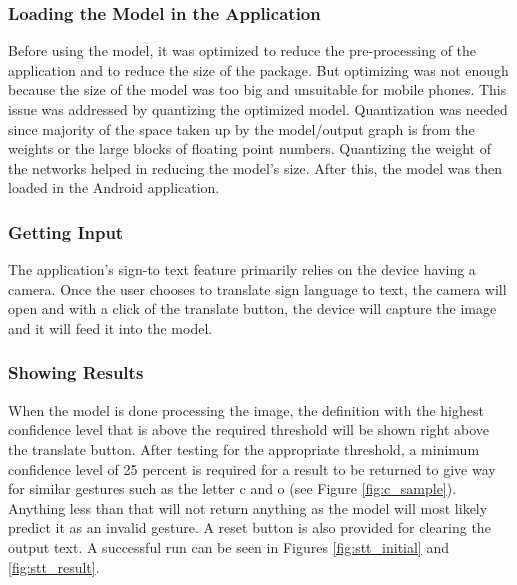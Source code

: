 \documentclass[journal]{./IEEE/IEEEtran}
\begin{document}
\subsubsection{Loading the Model in the Application}
Before using the model, it was optimized to reduce the pre-processing of the application and to reduce the size of the package. But optimizing was not enough because the size of the model was too big and unsuitable for mobile phones. This issue was addressed by quantizing the optimized model.
\newline
\indent Quantization was needed since majority of the space taken up by the model/output graph is from the weights or the large blocks of floating point numbers. Quantizing the weight of the networks helped in reducing the model's size. After this, the model was then loaded in the Android application.
\newline
\subsubsection{Getting Input}
The application's sign-to text feature primarily relies on the device having a camera. Once the user chooses to translate sign language to text, the camera will open and with a click of the translate button, the device will capture the image and it will feed it into the model.
\newline
\subsubsection{Showing Results}
When the model is done processing the image, the definition with the highest confidence level that is above the required threshold will be shown right above the translate button.
\newline
\indent After testing for the appropriate threshold, a minimum confidence level of 25 percent is required for a result to be returned to give way for similar gestures such as the letter c and o (see Figure \ref{fig:c_sample}). Anything less than that will not return anything as the model will most likely predict it as an invalid gesture. A reset button is also provided for clearing the output text. A successful run can be seen in Figures \ref{fig:stt_initial} and \ref{fig:stt_result}.
\end{document}
